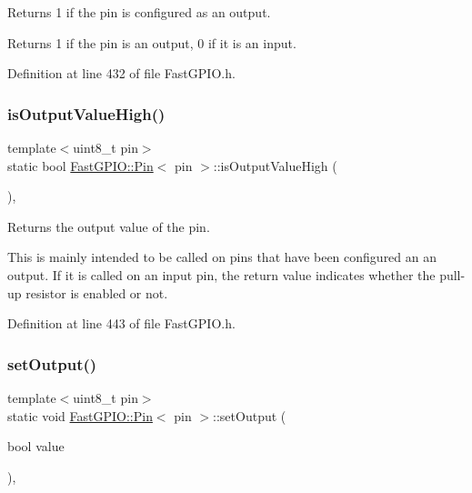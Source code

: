 Returns 1 if the pin is configured as an output. 

\begin{DoxyReturn}{Returns}
1 if the pin is an output, 0 if it is an input. 
\end{DoxyReturn}


Definition at line 432 of file Fast\+G\+P\+I\+O.\+h.

\mbox{\label{class_fast_g_p_i_o_1_1_pin_a28b30134fd55972feb708f07ec8104b7}} 
\subsubsection{\texorpdfstring{is\+Output\+Value\+High()}{isOutputValueHigh()}}
{\footnotesize\ttfamily template$<$uint8\+\_\+t pin$>$ \\
static bool \hyperlink{class_fast_g_p_i_o_1_1_pin}{Fast\+G\+P\+I\+O\+::\+Pin}$<$ pin $>$\+::is\+Output\+Value\+High (\begin{DoxyParamCaption}{ }\end{DoxyParamCaption})\hspace{0.3cm}{\ttfamily [inline]}, {\ttfamily [static]}}



Returns the output value of the pin. 

This is mainly intended to be called on pins that have been configured an an output. If it is called on an input pin, the return value indicates whether the pull-\/up resistor is enabled or not. 

Definition at line 443 of file Fast\+G\+P\+I\+O.\+h.

\mbox{\label{class_fast_g_p_i_o_1_1_pin_a87fb88b3ea6343db0e4a06f579a10249}} 
\subsubsection{\texorpdfstring{set\+Output()}{setOutput()}}
{\footnotesize\ttfamily template$<$uint8\+\_\+t pin$>$ \\
static void \hyperlink{class_fast_g_p_i_o_1_1_pin}{Fast\+G\+P\+I\+O\+::\+Pin}$<$ pin $>$\+::set\+Output (\begin{DoxyParamCaption}\item[{bool}]{value }\end{DoxyParamCaption})\hspace{0.3cm}{\ttfamily [inline]}, {\ttfamily [static]}}



